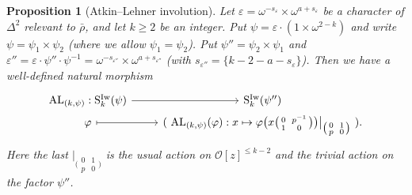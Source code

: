 \documentclass[12pt]{amsart}
\newtheorem{proposition}[subsection]{Proposition}
\theoremstyle{definition}
\numberwithin{equation}{subsection}
\def\calO{\mathcal{O}}
\def\rmS{\mathrm{S}}
\newcommand{\AL}{\mathrm{AL}}
\newcommand{\Iw}{\mathrm{Iw}}
\newcommand{\Matrix}[4]{{\big(\begin{smallmatrix}#1&#2\\#3& #4\end{smallmatrix} \big)}}
\begin{document}
\begin{proposition}[Atkin--Lehner involution]
\label{P:Atkin-Lehner duality_part1}
Let $\varepsilon = \omega^{-s_\varepsilon} \times \omega^{a+s_\varepsilon}$ be a character of $\Delta^2$ relevant to $\bar \rho$, and let $k \geq 2$ be an integer. Put $\psi = \varepsilon\cdot (1\times \omega^{2-k})$ and write $\psi=\psi_1\times \psi_2$ (where we allow $\psi_1 = \psi_2$). Put $\psi'' = \psi_2 \times \psi_1$ and $\varepsilon''= \varepsilon \cdot \psi'' \cdot \psi^{-1} = \omega^{-s_{\varepsilon''}} \times \omega^{a+s_{\varepsilon''}}$ (with $s_{\varepsilon''} = \{k-2-a-s_\varepsilon\}$). Then we have a well-defined natural morphism
\begin{equation}
\label{E:Atkin-Lehner map}
\begin{tikzcd}[row sep =0pt]
\AL_{(k, \psi)}: \rmS_{k}^{\Iw}( \psi)  \ar[r] &  \rmS_{k}^{\Iw}( \psi'')
\\
\varphi \ar[r, mapsto] & (\ \AL_{(k, \psi)}(\varphi): x \mapsto \varphi \big(x \Matrix 0{p^{-1}}10 \big)\big|_{\Matrix 01p0} \ ).
\end{tikzcd}
\end{equation}
Here the last $|_{\Matrix 01p0}$ is the usual action on $\calO[z]^{\leq k-2}$ and the \emph{trivial} action on the factor $\psi''$. 
\end{proposition}
\end{document}
